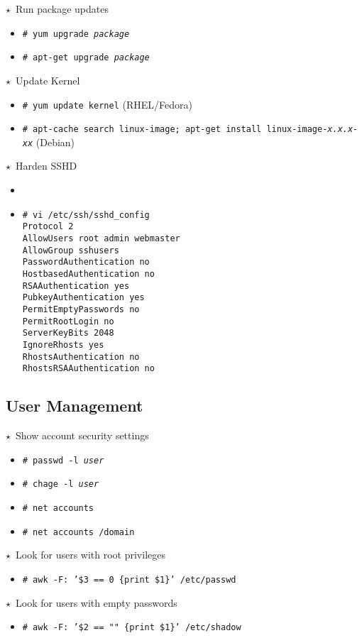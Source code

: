 \documentclass[10pt,landscape]{article}
\newcommand{\os}[1]{\texttt{\footnotesize{#1}}}
\newcommand{\unix}{\os{U}}
\newcommand{\linux}{\os{L}}
\newcommand{\windows}{\os{W}}
\newenvironment{action}[1]
  {\begin{minipage}[c]{\linewidth}$\star$~#1\begin{itemize}[leftmargin=1cm]}
  {\end{itemize}\end{minipage}\vspace*{3pt}}
\newcommand{\cmd}[2]{\item[#1] {\small\tt\# #2}}
\newcommand{\comment}[1]{\textrm{\small(#1)}}
\newcommand{\tool}[2]{\item[#1] {\footnotesize\sc{#2}}\xspace}
\begin{document}
\begin{multicols*}{3}
\begin{action}{Run package updates}
  \cmd{\linux}{yum upgrade \emph{package}}
  \cmd{\linux}{apt-get upgrade \emph{package}}
\end{action}

\begin{action}{Update Kernel}
  \cmd{\linux}{yum update kernel} \comment{RHEL/Fedora}
  \cmd{\linux}{apt-cache search linux-image; apt-get install
  linux-image-\emph{x.x.x-xx}} \comment{Debian}
\end{action}

\begin{action}{Harden SSHD}
  \tool{\unix}{fail2ban}
  \cmd{\unix}{vi /etc/ssh/sshd\_config\\
    Protocol 2\\
    AllowUsers root admin webmaster\\
    AllowGroup sshusers\\
    PasswordAuthentication no\\
    HostbasedAuthentication no\\
    RSAAuthentication yes\\
    PubkeyAuthentication yes\\
    PermitEmptyPasswords no\\
    PermitRootLogin no\\
    ServerKeyBits 2048\\
    IgnoreRhosts yes\\
    RhostsAuthentication no\\
    RhostsRSAAuthentication no}
\end{action}

\subsection*{User Management}

\begin{action}{Show account security settings}
\cmd{\unix}{passwd -l \emph{user}}
\cmd{\linux}{chage -l \emph{user}}
\cmd{\windows}{net accounts}
\cmd{\windows}{net accounts /domain}
\end{action}

\begin{action}{Look for users with root privileges}
\cmd{\unix}{awk -F: '\$3 == 0 \{print \$1\}' /etc/passwd}
\end{action}

\begin{action}{Look for users with empty passwords}
\cmd{\unix}{awk -F: '\$2 == "" \{print \$1\}' /etc/shadow}
\end{action}


\end{multicols*}
\end{document}
